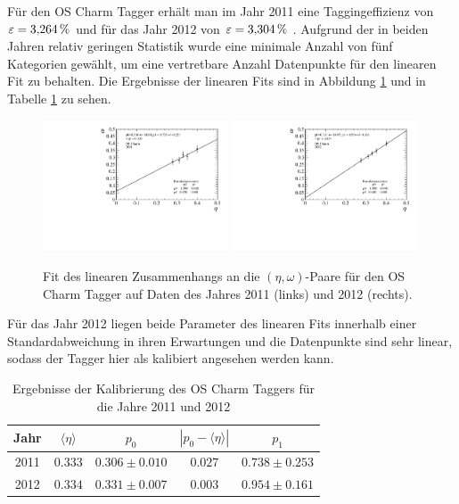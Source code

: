 Für den OS Charm Tagger erhält man im Jahr \num{2011} eine Taggingeffizienz von $\varepsilon=\SI{3{,}264}{\%}$ und für das Jahr \num{2012} von $\varepsilon=\SI{3{,}304}{\%}$ . Aufgrund der in beiden Jahren relativ geringen Statistik wurde eine minimale Anzahl von fünf Kategorien gewählt, um eine vertretbare Anzahl Datenpunkte für den linearen Fit zu behalten. Die Ergebnisse der linearen Fits sind in Abbildung \ref{fig:fit_OSCharm} und in Tabelle \ref{tab:result_OSCharm} zu sehen.
\begin{figure}[htbp]
	\centering
		\includegraphics[width=0.49\textwidth]{fig/2011_OSCharm.pdf}
		\includegraphics[width=0.49\textwidth]{fig/2012_OSCharm.pdf}
	\caption{Fit des linearen Zusammenhangs an die $(\eta,\omega)$-Paare für den OS Charm Tagger auf Daten des Jahres \num{2011} (links) und \num{2012} (rechts).}
	\label{fig:fit_OSCharm} 
\end{figure} 
Für das Jahr \num{2012} liegen beide Parameter des linearen Fits innerhalb einer Standardabweichung in ihren Erwartungen und die Datenpunkte sind sehr linear, sodass der Tagger hier als kalibiert angesehen werden kann. 
\begin{table}[htbp]
	\centering
	\caption{Ergebnisse der Kalibrierung des OS Charm Taggers für die Jahre \num{2011} und \num{2012}}
	\label{tab:result_OSCharm}
	\begin{tabular}{ccccc}
	\toprule
       Jahr & $\langle\eta\rangle$ & $p_0$ & $\left|p_0-\langle\eta\rangle\right|$ & $p_1$ \\ 
       \midrule
       2011 & $0{.}333$ & $0{.}306\pm0{.}010$ & $0{.}027$ & $0{.}738\pm0{.}253$ \\
      2012 & $0{.}334$ & $0{.}331\pm0{.}007$ & $0{.}003$ & $0{.}954\pm0{.}161$ \\ 
      \bottomrule
	\end{tabular}
\end{table}
